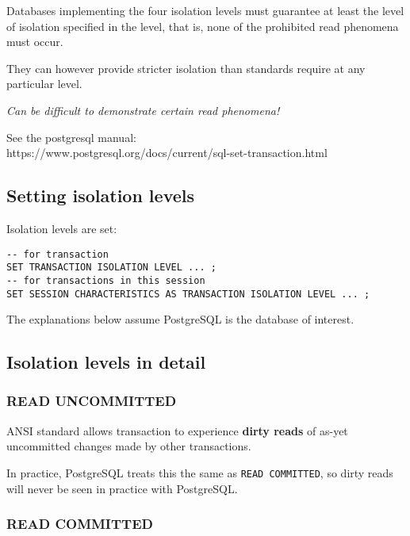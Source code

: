 \documentclass[slides]{pgnotes}
\begin{document}
Databases implementing the four isolation levels must guarantee at least the level of isolation specified in the level, that is, none of the prohibited read phenomena must occur.

They can however provide stricter isolation than standards require at any particular level.

\textit{Can be difficult to demonstrate certain read phenomena!}

See the postgresql manual:\\
https://www.postgresql.org/docs/current/sql-set-transaction.html

\subsection{Setting isolation levels}

Isolation levels are set:
\begin{verbatim}
-- for transaction 
SET TRANSACTION ISOLATION LEVEL ... ;
-- for transactions in this session
SET SESSION CHARACTERISTICS AS TRANSACTION ISOLATION LEVEL ... ; 
\end{verbatim}

The explanations below assume PostgreSQL is the database of interest.

\subsection{Isolation levels in detail}

\subsubsection{READ UNCOMMITTED}

ANSI standard allows transaction to experience \textbf{dirty reads} of as-yet uncommitted changes made by other transactions.

In practice, PostgreSQL treats this the same as \texttt{READ COMMITTED}, so dirty reads will never be seen in practice with PostgreSQL.



\subsubsection{READ COMMITTED}
\end{document}
